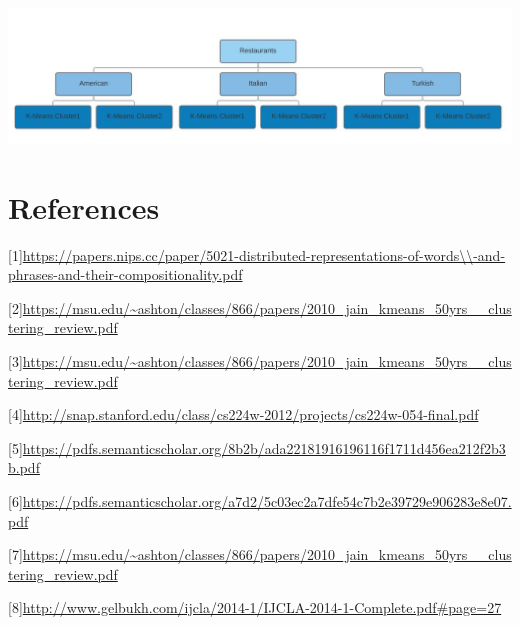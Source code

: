 \documentclass{article} %
\begin{document}
\begin{center}
  \includegraphics[width=\linewidth]{tablo.png}
\end{center}





\section{References}

[1]\url{https://papers.nips.cc/paper/5021-distributed-representations-of-words\\-and-phrases-and-their-compositionality.pdf} 

[2]\url{https://msu.edu/~ashton/classes/866/papers/2010_jain_kmeans_50yrs__clustering_review.pdf} 

[3]\url{https://msu.edu/~ashton/classes/866/papers/2010_jain_kmeans_50yrs__clustering_review.pdf} 


[4]\url{http://snap.stanford.edu/class/cs224w-2012/projects/cs224w-054-final.pdf}
 

[5]\url{https://pdfs.semanticscholar.org/8b2b/ada22181916196116f1711d456ea212f2b3b.pdf}



[6]\url{https://pdfs.semanticscholar.org/a7d2/5c03ec2a7dfe54c7b2e39729e906283e8e07.pdf}


[7]\url{https://msu.edu/~ashton/classes/866/papers/2010_jain_kmeans_50yrs__clustering_review.pdf}


[8]\url{http://www.gelbukh.com/ijcla/2014-1/IJCLA-2014-1-Complete.pdf#page=27}
\end{document}
